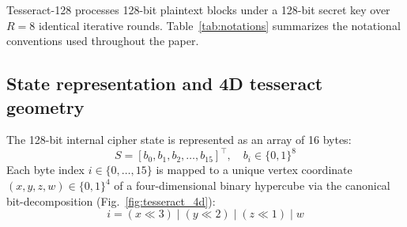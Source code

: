 \documentclass[review,12pt]{elsarticle}
\begin{document}
Tesseract-128 processes 128-bit plaintext blocks under a 128-bit secret key over $R = 8$ identical iterative rounds. Table~\ref{tab:notations} summarizes the notational conventions used throughout the paper.

\begin{table}[htbp]
\caption{Notational conventions.}
\label{tab:notations}
\centering
\small
{}
\end{table}

\subsection{State representation and 4D tesseract geometry}
The 128-bit internal cipher state is represented as an array of 16 bytes:
\begin{equation}
    S = [b_0, b_1, b_2, \dots, b_{15}]^\top, \quad b_i \in \{0, 1\}^8
\end{equation}
Each byte index $i \in \{0, \dots, 15\}$ is mapped to a unique vertex coordinate $(x, y, z, w) \in \{0, 1\}^4$ of a four-dimensional binary hypercube via the canonical bit-decomposition (Fig.~\ref{fig:tesseract_4d}):
\begin{equation}
    i = (x \ll 3) \mid (y \ll 2) \mid (z \ll 1) \mid w
\end{equation}
\end{document}

